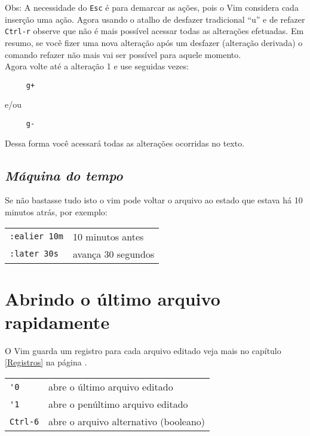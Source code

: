 Obs: A necessidade do {\tt Esc} é para demarcar as ações, pois o Vim
considera cada inserção uma ação.  Agora usando o atalho de desfazer
tradicional ``u'' e de refazer {\tt Ctrl-r} observe que não é mais possível
acessar todas as alterações efetuadas. Em resumo, se você fizer uma
nova alteração após um desfazer (alteração derivada) o comando refazer
não mais vai ser possível para aquele momento. \\

Agora volte até a alteração 1 e use seguidas vezes:

\begin{verbatim}
     g+
\end{verbatim}

e/ou

\begin{verbatim}
     g-
\end{verbatim}

Dessa forma você acessará todas as alterações ocorridas no texto.


\subsection{{\em Máquina do tempo}}
\label{Maquina do tempo}

Se não bastasse tudo isto o vim pode voltar o arquivo ao estado 
que estava há 10 minutos atrás, por exemplo:
\begin{table}[htb]\begin{center} \begin{tabular}{ll} \hline
    \verb|:ealier 10m| & 10 minutos antes\\
    \verb|:later 30s| & avança 30 segundos\\
\hline \end{tabular}\end{center}\end{table}

\section{Abrindo o último arquivo rapidamente}

O Vim guarda um registro para cada arquivo editado veja
mais no capítulo \ref{Registros} na página \pageref{Registros}.

\begin{table}[htb]\begin{center} \begin{tabular}{ll} \hline
     \verb|'0| &  abre o último arquivo editado\\
     \verb|'1| & abre o penúltimo arquivo editado\\
     \verb|Ctrl-6| & abre o arquivo alternativo (booleano)\\
\hline \end{tabular}\end{center}\end{table}

